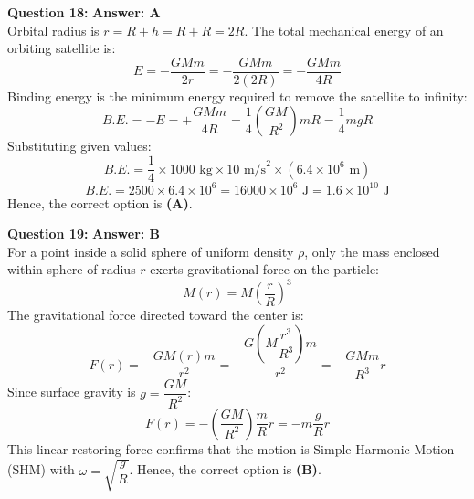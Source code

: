 \documentclass[11pt,a4paper]{article}
\begin{document}
\begin{tcolorbox}[solbox]
  \textbf{\textcolor{primaryDark}{Question 18:}} \hfill \textbf{\textcolor{l1Green}{Answer: A}}\\
  \vspace{3pt}
  Orbital radius is $r = R + h = R + R = 2R$.
\vspace{3pt}
The total mechanical energy of an orbiting satellite is:
$$E = -\frac{GMm}{2r} = -\frac{GMm}{2(2R)} = -\frac{GMm}{4R}$$
\vspace{3pt}
Binding energy is the minimum energy required to remove the satellite to infinity:
$$B.E. = -E = +\frac{GMm}{4R} = \frac{1}{4}\left(\frac{GM}{R^2}\right)m R = \frac{1}{4}mgR$$
\vspace{3pt}
Substituting given values:
$$B.E. = \frac{1}{4} \times 1000\text{ kg} \times 10\text{ m/s}^2 \times (6.4 \times 10^6\text{ m})$$
$$B.E. = 2500 \times 6.4 \times 10^6 = 16000 \times 10^6\text{ J} = 1.6 \times 10^{10}\text{ J}$$
\vspace{3pt}
Hence, the correct option is \textbf{(A)}.
\end{tcolorbox}
\vspace{3pt}

\begin{tcolorbox}[solbox]
  \textbf{\textcolor{primaryDark}{Question 19:}} \hfill \textbf{\textcolor{l1Green}{Answer: B}}\\
  \vspace{3pt}
  For a point inside a solid sphere of uniform density $\rho$, only the mass enclosed within sphere of radius $r$ exerts gravitational force on the particle:
$$M(r) = M\left(\frac{r}{R}\right)^3$$
\vspace{3pt}
The gravitational force directed toward the center is:
$$F(r) = -\frac{G M(r) m}{r^2} = -\frac{G \left(M \dfrac{r^3}{R^3}\right) m}{r^2} = -\frac{GMm}{R^3} r$$
\vspace{3pt}
Since surface gravity is $g = \dfrac{GM}{R^2}$:
$$F(r) = -\left(\frac{GM}{R^2}\right)\frac{m}{R}r = -m\frac{g}{R}r$$
\vspace{3pt}
This linear restoring force confirms that the motion is Simple Harmonic Motion (SHM) with $\omega = \sqrt{\dfrac{g}{R}}$.
\vspace{3pt}
Hence, the correct option is \textbf{(B)}.
\end{tcolorbox}
\vspace{3pt}
\end{document}
